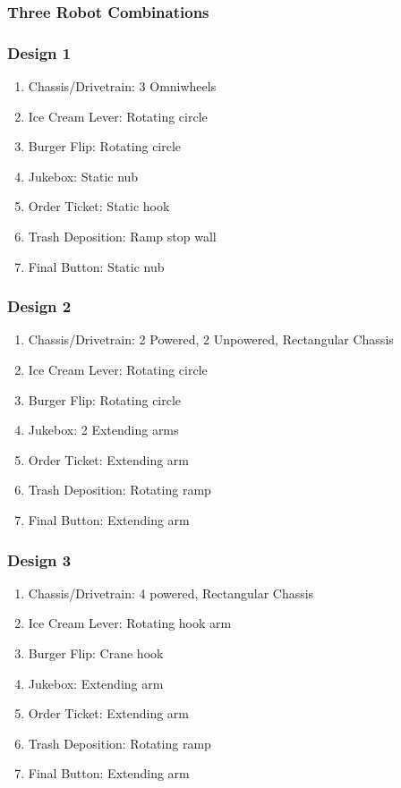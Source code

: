 \documentclass[12pt]{extarticle}
\begin{document}
\subsubsection*{Three Robot Combinations}
\subsubsection*{Design 1}
\begin{enumerate}
    \item Chassis/Drivetrain: 3 Omniwheels 
    \item Ice Cream Lever: Rotating circle
    \item Burger Flip: Rotating circle
    \item Jukebox: Static nub
    \item Order Ticket: Static hook
    \item Trash Deposition: Ramp stop wall
    \item Final Button: Static nub
\end{enumerate}

\subsubsection*{Design 2}
\begin{enumerate}
    \item Chassis/Drivetrain: 2 Powered, 2 Unpowered, Rectangular Chassis
    \item Ice Cream Lever: Rotating circle
    \item Burger Flip: Rotating circle
    \item Jukebox: 2 Extending arms
    \item Order Ticket: Extending arm
    \item Trash Deposition: Rotating ramp
    \item Final Button: Extending arm
\end{enumerate}

\subsubsection*{Design 3}
\begin{enumerate}
    \item Chassis/Drivetrain: 4 powered, Rectangular Chassis
    \item Ice Cream Lever: Rotating hook arm
    \item Burger Flip: Crane hook
    \item Jukebox: Extending arm
    \item Order Ticket: Extending arm
    \item Trash Deposition: Rotating ramp
    \item Final Button: Extending arm
\end{enumerate}
\end{document}
